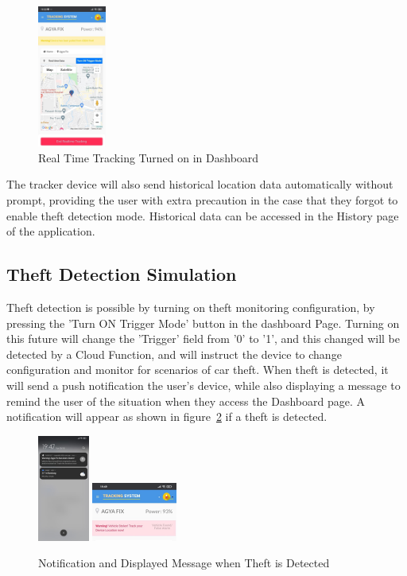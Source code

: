 \documentclass[conference]{IEEEtran}
\begin{document}
\begin{figure}[h]
    \centering
    \includegraphics[width=0.2\textwidth]{realtimeon}
    \caption{Real Time Tracking Turned on in Dashboard}
    \label{fig6}
\end{figure}

The tracker device will also send historical location data automatically without prompt, providing the user with extra precaution in the case that they forgot to enable theft detection mode. Historical data can be accessed in the History page of the application.

\subsection{Theft Detection Simulation}
Theft detection is possible by turning on theft monitoring configuration, by pressing the 'Turn ON Trigger Mode' button in the dashboard Page. Turning on this future will change the 'Trigger' field from '0' to '1', and this changed will be detected by a Cloud Function, and will instruct the device to change configuration and monitor for scenarios of car theft. When theft is detected, it will send a push notification the user's device, while also displaying a message to remind the user of the situation when they access the Dashboard page. A notification will appear as shown in figure~\ref{fig7} if a theft is detected.
\begin{figure}[htbp]
    \centering
    \includegraphics[width=0.15\textwidth]{notif1}
    \includegraphics[width=0.25\textwidth]{notif2}
    \caption{Notification and Displayed Message when Theft is Detected}
    \label{fig7}
\end{figure}
\end{document}

